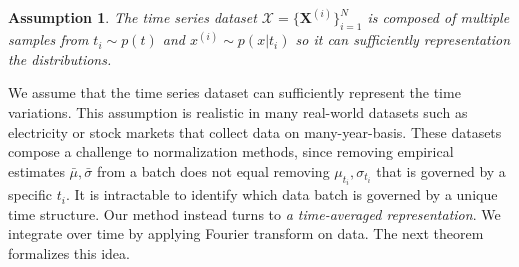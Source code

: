 \documentclass[sigconf,anonymous,review]{acmart}
\newtheorem{assumption}{\textbf{Assumption}}
\newcommand{\innerProduct}[2]{\left\langle #1, #2\right\rangle}
\begin{document}


\begin{assumption}\label{thm:assumption}
    The time series dataset $\mathcal{X} = \{\mathbf{X}^{(i)}\}_{i=1}^N$ is composed of multiple samples from $t_i \sim p(t)$ and $x^{(i)} \sim p(x | t_i)$ so it can sufficiently representation the distributions.
\end{assumption}
We assume that the time series dataset can sufficiently represent the time variations.
This assumption is realistic in many real-world datasets such as electricity or stock markets that collect data on many-year-basis.
These datasets compose a challenge to normalization methods, since removing empirical estimates $\bar{\mu}, \bar{\sigma}$ from a batch does not equal removing $\mu_{t_i}, \sigma_{t_i}$ that is governed by a specific $t_i$.
It is intractable to identify which data batch is governed by a unique time structure.
Our method instead turns to \emph{a time-averaged representation}.
We integrate over time by applying Fourier transform on data.
The next theorem formalizes this idea.
\end{document}

